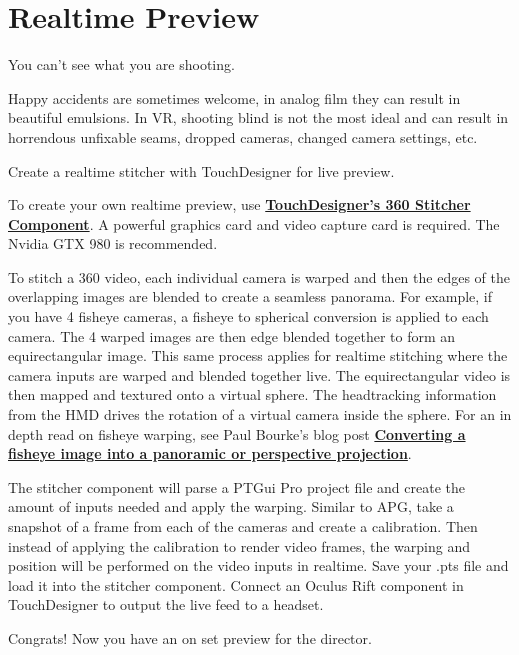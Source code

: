 \section{Realtime Preview}
\pagecolor{white}
\label{chap:11}
\begin{fullwidth}

\problem

{\large You can’t see what you are shooting. \par}


Happy accidents are sometimes welcome, in analog film they can result in beautiful emulsions. In VR, shooting blind is not the most ideal and can result in horrendous unfixable seams, dropped cameras, changed camera settings, etc. 


\solution

{\large Create a realtime stitcher with TouchDesigner for live preview. \par}

To create your own realtime preview, use \textbf{\href{https://www.derivative.ca/wiki088/index.php?title=Stitcher}{TouchDesigner’s 360 Stitcher Component}}. A powerful graphics card and video capture card is required. The Nvidia GTX 980 is recommended. 

To stitch a 360 video, each individual camera is warped and then the edges of the overlapping images are blended to create a seamless panorama. For example, if you have 4 fisheye cameras, a fisheye to spherical conversion is applied to each camera. The 4 warped images are then edge blended together to form an equirectangular image. This same process applies for realtime stitching where the camera inputs are warped and blended together live. The equirectangular video is then mapped and textured onto a virtual sphere. The headtracking information from the HMD drives the rotation of a virtual camera inside the sphere. For an in depth read on fisheye warping, see Paul Bourke's blog post \textbf{\href{http://paulbourke.net/dome/fish2/}{Converting a fisheye image into a panoramic or perspective projection}}.

The stitcher component will parse a PTGui Pro project file and create the amount of inputs needed and apply the warping. Similar to APG, take a snapshot of a frame from each of the cameras and create a calibration. Then instead of applying the calibration to render video frames, the warping and position will be performed on the video inputs in realtime. Save your .pts file and load it into the stitcher component. Connect an Oculus Rift component in TouchDesigner to output the live feed to a headset.

Congrats! Now you have an on set preview for the director.

\clearpage
\end{fullwidth}
